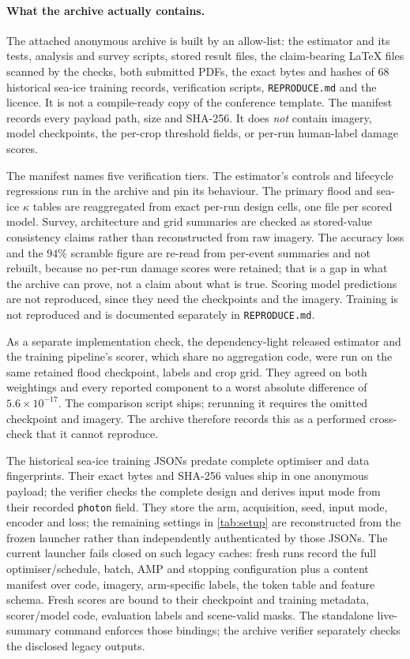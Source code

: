 \documentclass[10pt,twocolumn,letterpaper]{article}
\newcommand{\kap}{\kappa}
\begin{document}
\paragraph{What the archive actually contains.} The attached anonymous archive is built by an
allow-list: the estimator and its tests, analysis and survey scripts, stored result
files, the claim-bearing \LaTeX{} files scanned by the checks, both submitted PDFs,
the exact bytes and hashes of 68 historical sea-ice training records,
verification scripts, \texttt{REPRODUCE.md} and the licence. It is not a compile-ready
copy of the conference template. The manifest records every payload path, size and
SHA-256. It does \emph{not} contain
imagery, model checkpoints, the per-crop threshold fields, or per-run human-label
damage scores.

The manifest names five verification tiers. The estimator's controls and lifecycle
regressions run in the archive and pin its behaviour. The primary flood and sea-ice
$\kap$ tables are reaggregated from exact per-run design cells, one file per scored
model. Survey, architecture and grid summaries are checked as stored-value
consistency claims rather than reconstructed from raw imagery. The accuracy loss
and the $94\%$ scramble figure are re-read from per-event summaries and not rebuilt,
because no per-run damage scores were retained; that is a gap in what the archive
can prove, not a claim about what is true. Scoring model predictions
are not reproduced, since they need the checkpoints and the imagery. Training is not
reproduced and is documented separately in \texttt{REPRODUCE.md}.

As a separate implementation check, the dependency-light released estimator and
the training pipeline's scorer, which share no aggregation code, were run on the
same retained flood checkpoint, labels and crop grid. They agreed on both
weightings and every reported component to a worst absolute difference of
$5.6\times10^{-17}$. The comparison script ships; rerunning it requires the omitted
checkpoint and imagery. The archive therefore records this as a performed
cross-check that it cannot reproduce.

The historical sea-ice training JSONs predate complete optimiser and data
fingerprints. Their exact bytes and SHA-256 values ship in one anonymous payload;
the verifier checks the complete design and derives input mode from their recorded
\texttt{photon} field. They store the arm, acquisition, seed, input mode, encoder and loss;
the remaining settings in \cref{tab:setup} are reconstructed from the frozen
launcher rather than independently authenticated by those JSONs. The current
launcher fails closed on such legacy caches: fresh runs record the full
optimiser/schedule, batch, AMP and stopping configuration plus a content manifest
over code, imagery, arm-specific labels, the token table and feature schema. Fresh
scores are bound to their checkpoint and training metadata, scorer/model code,
evaluation labels and scene-valid masks. The standalone live-summary command
enforces those bindings; the archive verifier separately checks the disclosed
legacy outputs.
\end{document}

